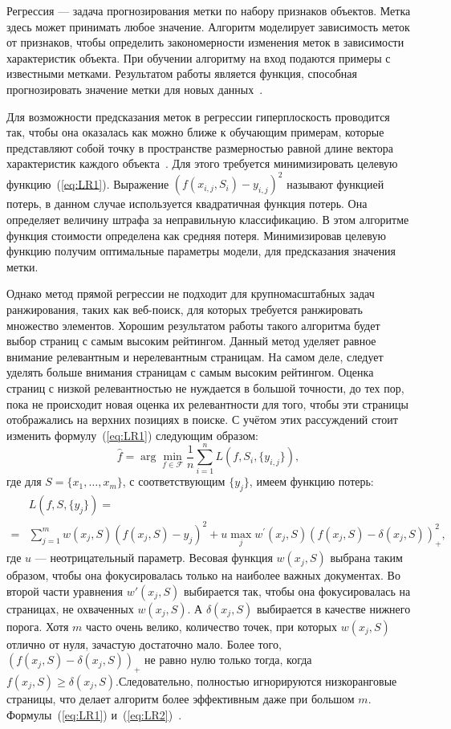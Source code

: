 Регрессия --- задача прогнозирования метки по набору признаков объектов. Метка здесь может принимать любое значение. Алгоритм моделирует зависимость меток от признаков, чтобы определить закономерности изменения меток в зависимости характеристик объекта. При обучении алгоритму на вход подаются примеры с известными метками. Результатом работы является функция, способная прогнозировать значение метки для новых данных~\cite{ML_no_wors}. 

Для возможности предсказания меток в регрессии гиперплоскость проводится так, чтобы  она оказалась как можно ближе к обучающим примерам, которые представляют собой точку в пространстве размерностью равной длине вектора характеристик каждого объекта~\cite{ML_no_wors}. Для этого требуется минимизировать целевую функцию~(\ref{eq:LR1}). Выражение $(f(x_{i, j}, S_i)-y_{i, j})^2$ называют функцией потерь, в данном случае используется квадратичная функция потерь. Она определяет величину штрафа за неправильную классификацию. В этом алгоритме функция стоимости определена как средняя потеря. Минимизировав целевую функцию получим оптимальные параметры модели, для предсказания значения метки.

Однако метод прямой регрессии не подходит для крупномасштабных задач ранжирования, таких как веб-поиск, для которых требуется ранжировать множество элементов. Хорошим результатом работы такого алгоритма будет выбор страниц с самым высоким рейтингом. Данный метод уделяет равное внимание релевантным и нерелевантным страницам. На самом деле, следует уделять больше внимания страницам с самым высоким рейтингом. Оценка страниц с низкой релевантностью не нуждается в большой точности, до тех пор, пока не происходит новая оценка их релевантности для того, чтобы эти страницы отображались на верхних позициях в поиске. С учётом этих рассуждений стоит изменить формулу~(\ref{eq:LR1}) следующим образом:
\begin{equation}
			\label{eq:LR2}
		\hat{f}=\arg \min _{f \in \mathcal{F}}
		\frac{1}{n} \sum_{i=1}^n L(f, S_i,\{y_{i, j}\}),
\end{equation}
где для $S = \{x_{1}, \dots, x_{m}\}$, с соответствующим $\{y_{j}\}$, имеем функцию потерь:
\[
\begin{aligned}
	& L(f, S,\{y_j\})= \\
	= & \sum_{j=1}^m w(x_j, S)(f(x_j, S)-y_j)^2+u \max_j w^{\prime}(x_j, S)(f(x_j, S)-\delta(x_j, S))_{+}^2,
\end{aligned}
\]
где $u$ --- неотрицательный параметр. Весовая функция $w(x_j, S)$ выбрана таким образом, чтобы она фокусировалась только на наиболее важных документах. Во второй части уравнения $w'(x_j, S)$ выбирается так, чтобы она фокусировалась на страницах, не охваченных $w(x_j, S)$.  А $\delta(x_j, S)$ выбирается в качестве нижнего порога. Хотя $m$ часто очень велико, количество точек, при которых $w(x_j, S)$ отлично от нуля, зачастую достаточно мало. Более того, $(f(x_j, S)-\delta(x_j, S))_{+}$ не равно нулю только тогда, когда $f(x_j, S) \geq \delta(x_j, S)$.Следовательно, полностью игнорируются низкоранговые страницы, что делает алгоритм более эффективным даже при большом $m$. Формулы~(\ref{eq:LR1}) и~(\ref{eq:LR2})~\cite{LR}. 

